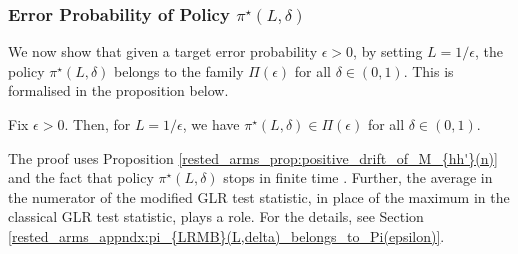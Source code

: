 \subsubsection{Error Probability of Policy $\pi^\star(L,\delta)$}
We now show that given a target error probability $\epsilon>0$, by setting $L=1/\epsilon$, the policy $\pi^\star(L,\delta)$ belongs to the family $\Pi(\epsilon)$ for all $\delta\in (0,1)$. This is formalised in the proposition below.
\begin{prop}\label{rested_arms_prop:pi_{LRMB}(L,delta)_belongs_to_Pi(epsilon)}
	Fix $\epsilon>0$. Then, for $L=1/\epsilon$, we have $\pi^\star(L,\delta)\in\Pi(\epsilon)$ for all $\delta\in(0,1)$.
\end{prop}
{The proof uses Proposition \ref{rested_arms_prop:positive_drift_of_M_{hh'}(n)} and the fact that policy $\pi^{\star}(L,\delta)$ stops in finite time . Further, the average in the numerator of the modified GLR test statistic, in place of the maximum in the classical GLR test statistic, plays a role. For the details, see Section \ref{rested_arms_appndx:pi_{LRMB}(L,delta)_belongs_to_Pi(epsilon)}.}

